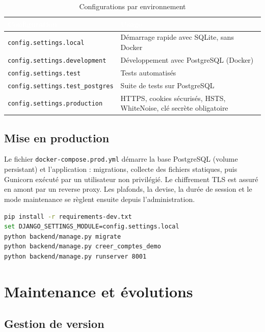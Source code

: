 \documentclass[11pt,a4paper]{report}
\newcommand{\entete}{\rowcolor{primaire}}
\newcommand{\tete}[1]{\textcolor{white}{\textbf{#1}}}
\newcommand{\code}[1]{\texttt{\small #1}}
\begin{document}
\begin{table}[H]
\centering
\caption{Configurations par environnement}
\begin{tabularx}{\linewidth}{@{}p{5.4cm}Y@{}}
\toprule
\entete \tete{Configuration} & \tete{Usage} \\
\midrule
\code{config.settings.local} & Démarrage rapide avec SQLite, sans Docker \\
\code{config.settings.development} & Développement avec PostgreSQL (Docker) \\
\code{config.settings.test} & Tests automatisés \\
\code{config.settings.test\_postgres} & Suite de tests sur PostgreSQL \\
\code{config.settings.production} & HTTPS, cookies sécurisés, HSTS, WhiteNoise, clé secrète obligatoire \\
\bottomrule
\end{tabularx}
\end{table}

\section{Mise en production}

Le fichier \code{docker-compose.prod.yml} démarre la base PostgreSQL (volume
persistant) et l'application : migrations, collecte des fichiers statiques, puis
Gunicorn exécuté par un utilisateur non privilégié. Le chiffrement TLS est assuré en
amont par un reverse proxy. Les plafonds, la devise, la durée de session et le mode
maintenance se règlent ensuite depuis l'administration.

\begin{lstlisting}[language=bash, caption={Lancement local en quelques commandes}, numbers=none]
pip install -r requirements-dev.txt
set DJANGO_SETTINGS_MODULE=config.settings.local
python backend/manage.py migrate
python backend/manage.py creer_comptes_demo
python backend/manage.py runserver 8001
\end{lstlisting}

\chapter{Maintenance et évolutions}

\section{Gestion de version}
\end{document}
